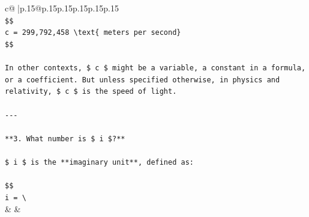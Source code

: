 \documentclass{article}
\begin{document}
{\begin{supertabular}{c@{$\;$}|p{.15\linewidth}@{}p{.15\linewidth}p{.15\linewidth}p{.15\linewidth}p{.15\linewidth}p{.15\linewidth}}
{{{\\ 
\texttt{\$\$} \\
\texttt{c = 299,792,458 \textbackslash{}text\{ meters per second\}} \\
\texttt{\$\$} \\
\\ 
\texttt{In other contexts, \$ c \$ might be a variable, a constant in a formula, or a coefficient. But unless specified otherwise, in physics and relativity, \$ c \$ is the speed of light.} \\
\\ 
\texttt{{-}{-}{-}} \\
\\ 
\texttt{**3. What number is \$ i \$?**} \\
\\ 
\texttt{\$ i \$ is the **imaginary unit**, defined as:} \\
\\ 
\texttt{\$\$} \\
\texttt{i = \textbackslash{}} \\
            }
        }
    }
    & & \\ \\


\end{supertabular}}
\end{document}
